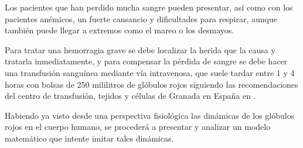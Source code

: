 Los pacientes que han perdido mucha sangre pueden presentar, así como con los pacientes anémicos, un fuerte cansancio y dificultades para respirar, aunque también puede llegar a extremos como el mareo o los desmayos.

Para tratar una hemorragia grave se debe localizar la herida que la causa y tratarla inmediatamente, y para compensar la pérdida de sangre se debe hacer una transfusión sanguínea mediante vía intravenosa, que suele tardar entre 1 y 4 horas con bolsas de 250 mililitros de glóbulos rojos siguiendo las recomendaciones del centro de transfusión, tejidos y células de Granada en España en \cite{Granada}. 

Habiendo ya visto desde una perspectiva fisiológica las dinámicas de los glóbulos rojos en el cuerpo humano, se procederá a presentar y analizar un modelo matemático que intente imitar tales dinámicas.
